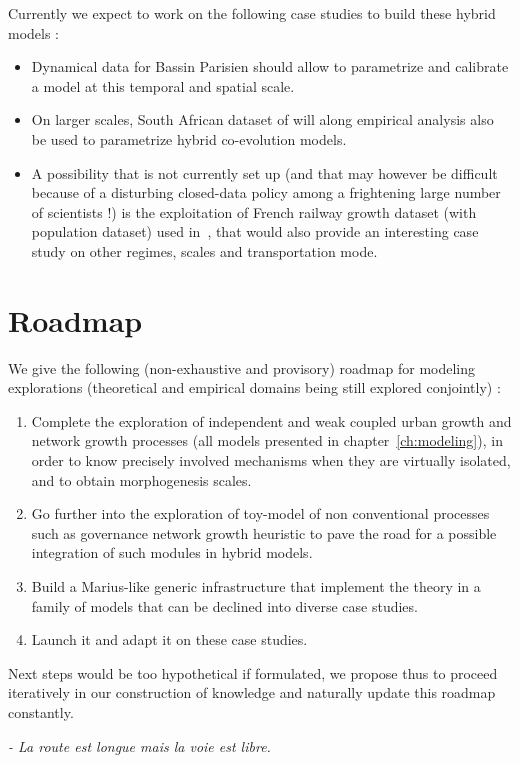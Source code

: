 Currently we expect to work on the following case studies to build these hybrid models :

\begin{itemize}
\item Dynamical data for Bassin Parisien should allow to parametrize and calibrate a model at this temporal and spatial scale.
\item On larger scales, South African dataset of  will along empirical analysis also be used to parametrize hybrid co-evolution models.
\item A possibility that is not currently set up (and that may however be difficult because of a disturbing closed-data policy among a frightening large number of scientists !) is the exploitation of French railway growth dataset (with population dataset) used in~\cite{bretagnolle:tel-00459720}, that would also provide an interesting case study on other regimes, scales and transportation mode.
\end{itemize}






\section{Roadmap}


We give the following (non-exhaustive and provisory) roadmap for modeling explorations (theoretical and empirical domains being still explored conjointly) :

\begin{enumerate}
\item Complete the exploration of independent and weak coupled urban growth and network growth processes (all models presented in chapter~\ref{ch:modeling}), in order to know precisely involved mechanisms when they are virtually isolated, and to obtain morphogenesis scales.
\item Go further into the exploration of toy-model of non conventional processes such as governance network growth heuristic to pave the road for a possible integration of such modules in hybrid models.
\item Build a Marius-like generic infrastructure that implement the theory in a family of models that can be declined into diverse case studies.
\item Launch it and adapt it on these case studies.
\end{enumerate}

Next steps would be too hypothetical if formulated, we propose thus to proceed iteratively in our construction of knowledge and naturally update this roadmap constantly.

\bigskip
\bigskip
\bigskip

\textit{ - La route est longue mais la voie est libre.}








